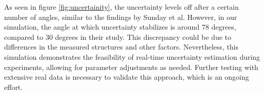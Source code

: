 As seen in figure \ref{fig:uncertainity}, the uncertainty levels off after a certain number of angles, similar to the findings by Sunday et al.
However, in our simulation, the angle at which uncertainty stabilizes is around 78 degrees, 
compared to 30 degrees in their study. This discrepancy could be due to differences in the measured
structures and other factors. Nevertheless, this simulation demonstrates the feasibility of real-time 
uncertainty estimation during experiments, allowing for parameter adjustments as needed. Further 
testing with extensive real data is necessary to validate this approach, which is an ongoing effort.
